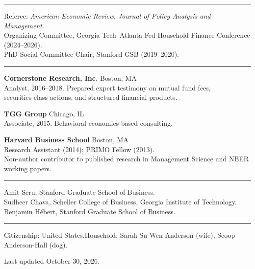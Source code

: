 \documentclass[11pt]{article}
\newcommand{\cvsection}[1]{\needspace{3.5\baselineskip}\vspace{0.5em}{\large\scshape #1}\par\vspace{-0.45em}\rule{\linewidth}{0.4pt}\par\vspace{0.25em}}
\newcommand{\entry}[3]{\noindent\textbf{#1} \hfill #2\\ #3\par\vspace{0.35em}}
\begin{document}
\cvsection{Service}

Referee: \emph{American Economic Review}, \emph{Journal of Policy Analysis and Management}.\\
Organizing Committee, Georgia Tech--Atlanta Fed Household Finance Conference (2024--2026).\\
PhD Social Committee Chair, Stanford GSB (2019--2020).

\cvsection{Professional Experience}

\entry{Cornerstone Research, Inc.}{Boston, MA}{Analyst, 2016--2018. Prepared expert testimony on mutual fund fees,\\ securities class actions, and structured financial products.}
\entry{TGG Group}{Chicago, IL}{Associate, 2015. Behavioral-economics-based consulting.}
\entry{Harvard Business School}{Boston, MA}{Research Assistant (2014); PRIMO Fellow (2013).\\ Non-author contributor to published research in Management Science and NBER working papers.}

\cvsection{References}

Amit Seru, Stanford Graduate School of Business.\\
Sudheer Chava, Scheller College of Business, Georgia Institute of Technology.\\
Benjamin H\'ebert, Stanford Graduate School of Business.

\cvsection{Personal}

Citizenship: United States.\quad Household: Sarah Su-Wen Anderson (wife), Scoop Anderson-Hall (dog).

\vfill
\begin{center}\footnotesize Last updated October 30, 2026.\end{center}
\end{document}
